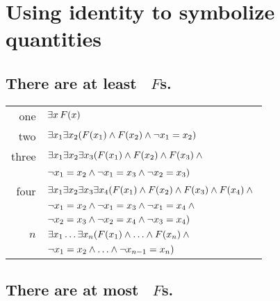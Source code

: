 






\newpage
\section{Using identity to symbolize quantities}

\subsection*{There are at least \blank\ $F$s.}
\label{summary.atleast}

\begin{tabular*}{\textwidth}{rl}
one & $\exists x\,\mathord{F}(x)$\\
two & $\exists x_1\exists x_2(\mathord{F}(x_1) \wedge \mathord{F}(x_2) \wedge \neg x_1  = x_2)$\\
three & $\exists x_1\exists x_2\exists x_3(\mathord{F}(x_1) \wedge \mathord{F}(x_2) \wedge \mathord{F}(x_3) \wedge {}$\\
& $\neg x_1 = x_2 \wedge\neg x_1 = x_3 \wedge \neg x_2 = x_3)$\\
four & $\exists x_1\exists x_2\exists x_3\exists x_4 (\mathord{F}(x_1) \wedge \mathord{F}(x_2) \wedge \mathord{F}(x_3) \wedge \mathord{F}(x_4) \wedge {}$\\
& $\neg x_1 = x_2 \wedge \neg x_1 = x_3 \wedge \neg x_1 = x_4 \wedge {}$\\
& $ \neg x_2 = x_3 \wedge \neg x_2 = x_4 \wedge \neg x_3 = x_4)$\\
$n$ & $\exists x_1\ldots\exists x_n(\mathord{F}(x_1) \wedge \ldots \wedge \mathord{F}(x_n) \wedge {}$\\
& $\neg x_1 = x_2 \wedge\ldots\wedge \neg x_{n-1} = x_n)$ 
\end{tabular*}

\subsection*{There are at most \blank\ $F$s.}
\label{summary.atmost}

